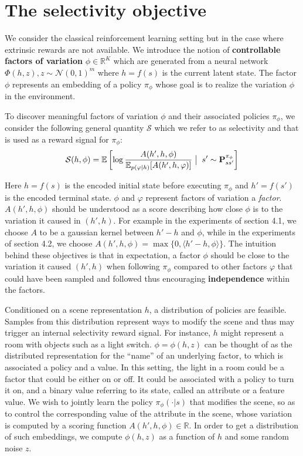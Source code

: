 \section{The selectivity objective}
We consider the classical reinforcement learning setting but in the case where extrinsic rewards are not available. We introduce the notion of \textbf{controllable factors of variation} $\phi \in \mathbb{R}^K$ which are generated from a neural network $\Phi(h, z), z \sim \mathcal{N}(0, 1)^m$ where $h = f(s)$ is the current latent state. The factor $\phi$ represents an embedding of a policy $\pi_\phi$ whose goal is to realize the variation $\phi$ in the environment.

To discover meaningful factors of variation $\phi$ and their associated policies $\pi_\phi$, we consider the following general quantity $\mathcal{S}$ which we refer to as selectivity and that is used as a reward signal for $\pi_\phi$:
\begin{equation}
    \mathcal{S}(h, \phi) = \mathbb{E}  \left[\log \frac{A(h', h, \phi)}{\mathbb{E}_{p(\varphi|h)}[A(h', h, \varphi)]} \;\big|\; \; {s' \sim {\mathbf{P}}^{\pi_\phi}_{ss'}}\right]
      \label{eq:general-selectivity}
\end{equation}

Here $h=f(s)$ is the encoded initial state before executing $\pi_\phi$ and   $h' = f(s')$ is the encoded terminal state. $\phi$ and $\varphi$ represent factors of variation a \emph{factor}.
$A(h', h, \phi)$ should be understood as a score describing how close $\phi$ is to the variation it caused in $(h', h)$. For example in the experiments of section 4.1, we choose $A$ to be a gaussian kernel between $h'-h$ and $\phi$, while in the experiments of section 4.2, we choose $A(h', h, \phi) = \max\{0,\langle h'-h, \phi \rangle\}$.
The intuition behind these objectives is that in expectation, a factor $\phi$ should be close to the variation it caused $(h', h)$ when following $\pi_\phi$ compared to other factors $\varphi$ that could have been sampled and followed thus encouraging \textbf{independence} within the factors.


Conditioned on a scene representation $h$, a distribution of policies are feasible. Samples from this distribution represent ways to modify the scene and thus may trigger an internal selectivity reward signal. For instance, $h$ might represent a room with objects such as a light switch. $\phi = \phi(h,z)$ can be thought of as the distributed representation for the ``name'' of an underlying factor, to which is associated a policy and a value.  In this setting, the light in a room could be a factor that could be either on or off. It could be associated with a policy to turn it on, and a binary value referring to its state, called an attribute or a feature value.%
We wish to jointly learn the policy $\pi_\phi(\cdot|s)$ that modifies the scene, so as to control the corresponding value of the attribute in the scene, whose variation is computed by a scoring function $A(h', h, \phi) \in \mathbb{R}$. In order to get a distribution of such embeddings, we compute $\phi(h,z)$ as a function of $h$ and some random noise $z$.




